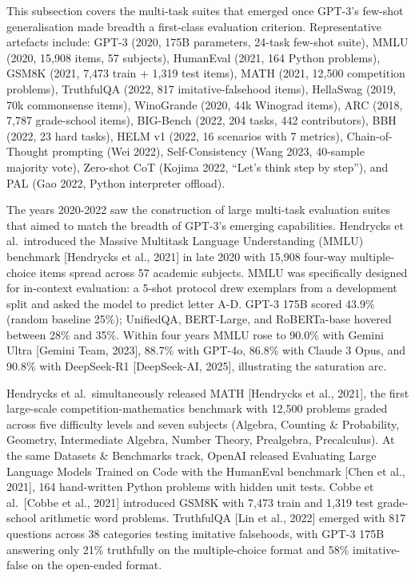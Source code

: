 This subsection covers the multi-task suites that emerged once GPT-3's few-shot generalisation made breadth a first-class evaluation criterion. Representative artefacts include: GPT-3 (2020, 175B parameters, 24-task few-shot suite), MMLU (2020, 15,908 items, 57 subjects), HumanEval (2021, 164 Python problems), GSM8K (2021, 7,473 train + 1,319 test items), MATH (2021, 12,500 competition problems), TruthfulQA (2022, 817 imitative-falsehood items), HellaSwag (2019, 70k commonsense items), WinoGrande (2020, 44k Winograd items), ARC (2018, 7,787 grade-school items), BIG-Bench (2022, 204 tasks, 442 contributors), BBH (2022, 23 hard tasks), HELM v1 (2022, 16 scenarios with 7 metrics), Chain-of-Thought prompting (Wei 2022), Self-Consistency (Wang 2023, 40-sample majority vote), Zero-shot CoT (Kojima 2022, ``Let's think step by step''), and PAL (Gao 2022, Python interpreter offload).

The years 2020-2022 saw the construction of large multi-task evaluation suites that aimed to match the breadth of GPT-3's emerging capabilities. Hendrycks et al.~introduced the Massive Multitask Language Understanding (MMLU) benchmark {[}Hendrycks et al., 2021{]} in late 2020 with 15,908 four-way multiple-choice items spread across 57 academic subjects. MMLU was specifically designed for in-context evaluation: a 5-shot protocol drew exemplars from a development split and asked the model to predict letter A-D. GPT-3 175B scored 43.9\% (random baseline 25\%); UnifiedQA, BERT-Large, and RoBERTa-base hovered between 28\% and 35\%. Within four years MMLU rose to 90.0\% with Gemini Ultra {[}Gemini Team, 2023{]}, 88.7\% with GPT-4o, 86.8\% with Claude 3 Opus, and 90.8\% with DeepSeek-R1 {[}DeepSeek-AI, 2025{]}, illustrating the saturation arc.

Hendrycks et al.~simultaneously released MATH {[}Hendrycks et al., 2021{]}, the first large-scale competition-mathematics benchmark with 12,500 problems graded across five difficulty levels and seven subjects (Algebra, Counting \& Probability, Geometry, Intermediate Algebra, Number Theory, Prealgebra, Precalculus). At the same Datasets \& Benchmarks track, OpenAI released Evaluating Large Language Models Trained on Code with the HumanEval benchmark {[}Chen et al., 2021{]}, 164 hand-written Python problems with hidden unit tests. Cobbe et al.~{[}Cobbe et al., 2021{]} introduced GSM8K with 7,473 train and 1,319 test grade-school arithmetic word problems. TruthfulQA {[}Lin et al., 2022{]} emerged with 817 questions across 38 categories testing imitative falsehoods, with GPT-3 175B answering only 21\% truthfully on the multiple-choice format and 58\% imitative-false on the open-ended format.


